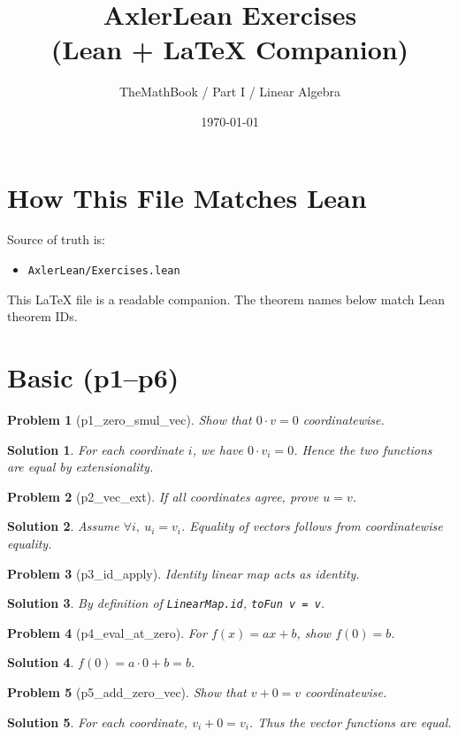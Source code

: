 \documentclass[11pt]{article}
\title{AxlerLean Exercises\\(Lean + LaTeX Companion)}
\author{TheMathBook / Part I / Linear Algebra}
\date{\today}
\newtheorem*{problem}{Problem}
\newtheorem*{solution}{Solution}
\begin{document}
\maketitle

\section*{How This File Matches Lean}
Source of truth is:
\begin{itemize}[leftmargin=1.5em]
  \item \texttt{AxlerLean/Exercises.lean}
\end{itemize}

This LaTeX file is a readable companion. The theorem names below match Lean theorem IDs.

\section*{Basic (p1--p6)}

\begin{problem}[p1\_zero\_smul\_vec]
Show that $0 \cdot v = 0$ coordinatewise.
\end{problem}
\begin{solution}
For each coordinate $i$, we have $0 \cdot v_i = 0$. Hence the two functions are equal by extensionality.
\end{solution}

\begin{problem}[p2\_vec\_ext]
If all coordinates agree, prove $u=v$.
\end{problem}
\begin{solution}
Assume $\forall i,\ u_i=v_i$. Equality of vectors follows from coordinatewise equality.
\end{solution}

\begin{problem}[p3\_id\_apply]
Identity linear map acts as identity.
\end{problem}
\begin{solution}
By definition of \texttt{LinearMap.id}, \texttt{toFun v = v}.
\end{solution}

\begin{problem}[p4\_eval\_at\_zero]
For $f(x)=ax+b$, show $f(0)=b$.
\end{problem}
\begin{solution}
$f(0)=a\cdot0+b=b$.
\end{solution}

\begin{problem}[p5\_add\_zero\_vec]
Show that $v+0=v$ coordinatewise.
\end{problem}
\begin{solution}
For each coordinate, $v_i+0=v_i$. Thus the vector functions are equal.
\end{solution}
\end{document}
